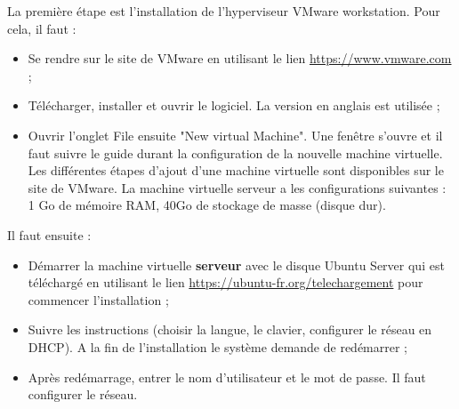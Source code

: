 \documentclass[a4paper,12pt,french]{report} %
\begin{document}
La première étape est l'installation de l'hyperviseur VMware workstation. Pour cela,  il faut :
\begin{itemize}
	\item Se rendre sur le site de VMware en  utilisant le lien \url{https://www.vmware.com} ; %
	\item Télécharger, installer et ouvrir le logiciel. La version en anglais est utilisée ; 
	\item Ouvrir l'onglet File ensuite "New virtual Machine". Une fenêtre s'ouvre et il faut suivre le guide durant la configuration de la nouvelle machine virtuelle. Les différentes étapes d'ajout d'une machine virtuelle sont disponibles sur le site de VMware. La machine virtuelle serveur a les configurations suivantes : 1 Go de mémoire RAM, 40Go de stockage de masse (disque dur).
\end{itemize}

Il faut ensuite :
\begin{itemize}
	\item Démarrer la machine virtuelle \textbf{serveur} avec le disque Ubuntu Server qui est téléchargé en utilisant le lien \url{https://ubuntu-fr.org/telechargement} pour commencer l'installation ; 
	\item Suivre les instructions (choisir la langue, le clavier, configurer le réseau en DHCP). A la fin de l'installation le système demande de redémarrer ;
	\item  Après redémarrage, entrer le nom d'utilisateur et le mot de passe. Il faut configurer le réseau. 
\end{itemize}
\end{document}
